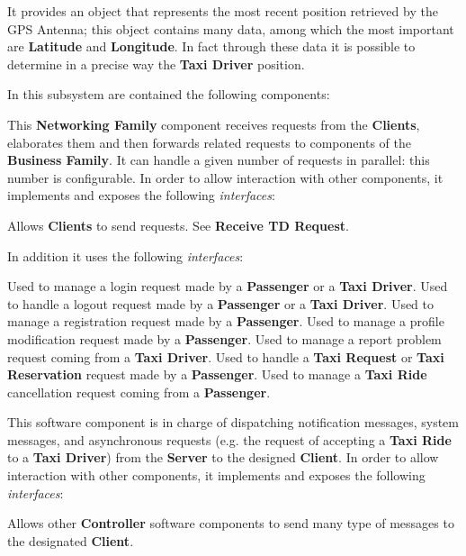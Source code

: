 \begin{itemize}
\begin{itemize}
		It provides an object that represents the most recent position retrieved by the GPS Antenna; this object contains many data, among which the most important are \textbf{Latitude} and \textbf{Longitude}.
		In fact through these data it is possible to determine in a precise way the \textbf{Taxi Driver} position.
	\end{itemize}
	In this subsystem are contained the following components:
	\begin{itemize}
		This \textbf{Networking Family} component receives requests from the \textbf{Clients}, elaborates them and then forwards related requests to components of the \textbf{Business Family}.
		It can handle a given number of requests in parallel: this number is configurable.
		In order to allow interaction with other components, it implements and exposes the following \textit{interfaces}:
		\begin{itemize}
			 Allows \textbf{Clients} to send requests.
			 See \textbf{Receive TD Request}.
		\end{itemize}
		In addition it uses the following \textit{interfaces}:
		\begin{itemize}
			 Used to manage a login request made by a \textbf{Passenger} or a \textbf{Taxi Driver}.
			 Used to handle a logout request made by a \textbf{Passenger} or a \textbf{Taxi Driver}.
			 Used to manage a registration request made by a \textbf{Passenger}.
			 Used to manage a profile modification request made by a \textbf{Passenger}.
			 Used to manage a report problem request coming from a \textbf{Taxi Driver}.
			 Used to handle a \textbf{Taxi Request} or \textbf{Taxi Reservation} request made by a \textbf{Passenger}.
			 Used to manage a \textbf{Taxi Ride} cancellation request coming from a \textbf{Passenger}.
		\end{itemize}
		 This software component is in charge of dispatching notification messages, system messages, and asynchronous requests (e.g. the request of accepting a \textbf{Taxi Ride} to a \textbf{Taxi Driver}) from the \textbf{Server} to the designed \textbf{Client}.
		In order to allow interaction with other components, it implements and exposes the following \textit{interfaces}:
		\begin{itemize}
			 Allows other \textbf{Controller} software components to send many type of messages to the designated \textbf{Client}.

\end{itemize}
\end{itemize}
\end{itemize}
